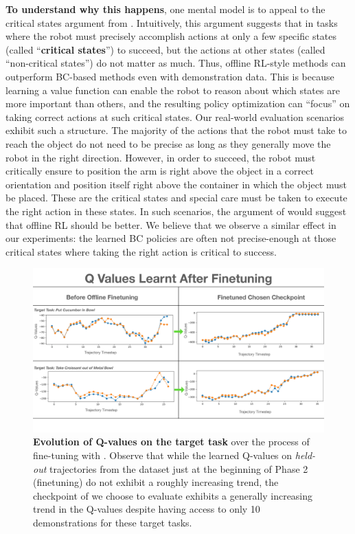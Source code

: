 \documentclass[conference]{IEEEtran}
\begin{document}
\textbf{To understand why this happens}, one mental model is to appeal to the critical states argument from \citet{kumar2022should}. Intuitively, this argument suggests that in tasks where the robot must precisely accomplish actions at only a few specific states (called ``\textbf{critical states}'') to succeed, but the actions at other states (called ``non-critical states'') do not matter as much. Thus, offline RL-style methods can outperform BC-based methods even with demonstration data. This is because learning a value function can enable the robot to reason about which states are more important than others, and the resulting policy optimization can ``focus'' on taking correct actions at such critical states. Our real-world evaluation scenarios exhibit such a structure. The majority of the actions that the robot must take to reach the object do not need to be precise as long as they generally move the robot in the right direction. However, in order to succeed, the robot must critically ensure to position the arm is right above the object in a correct orientation and position itself right above the container in which the object must be placed. These are the critical states and special care must be taken to execute the right action in these states. In such scenarios, the argument of \citet{kumar2022should} would suggest that offline RL should be better. We believe that we observe a similar effect in our experiments: the learned BC policies are often not precise-enough at those critical states where taking the right action is critical to success.  

\begin{figure}[h]
\centering
\vspace{-0.4cm}
  \includegraphics[width=0.78\linewidth]{FinetuningQvalPlot.pdf}
  \vspace{-0.5cm}
  \caption{\footnotesize \textbf{Evolution of Q-values on the target task} over the process of fine-tuning with \methodname. Observe that while the learned Q-values on \emph{held-out} trajectories from the dataset just at the beginning of Phase 2 (finetuning) do not exhibit a roughly increasing trend, the checkpoint of \methodname we choose to evaluate exhibits a generally increasing trend in the Q-values despite having access to only 10 demonstrations for these target tasks.}
  \label{fig:finetunedQvals2}
  \vspace{-0.3cm}
\end{figure}
\end{document}
